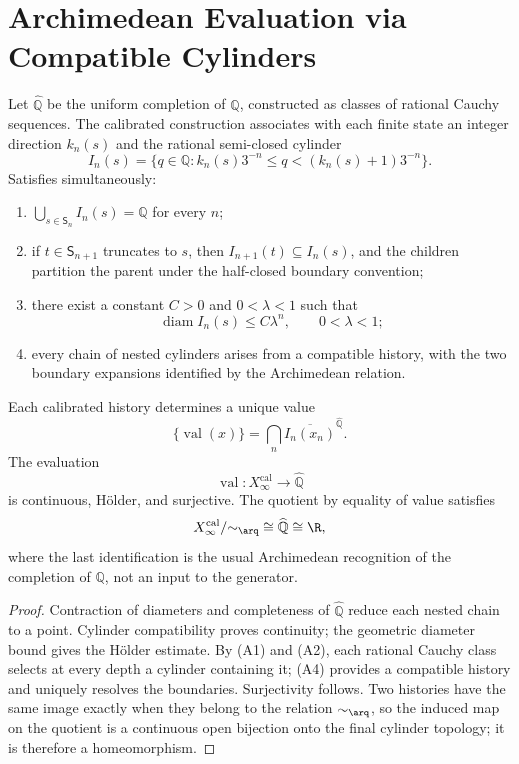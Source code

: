 \section{Archimedean Evaluation via Compatible Cylinders}

Let \(\widehat{\mathbb Q}\) be the uniform completion of \(\mathbb Q\), constructed as
classes of rational Cauchy sequences. The calibrated construction associates
with each finite state an integer direction \(k_n(s)\) and the rational
semi-closed cylinder
\[
 I_n(s)=\{q\in\mathbb Q:k_n(s)3^{-n}\le q<(k_n(s)+1)3^{-n}\}.
\]
Satisfies simultaneously:
\begin{enumerate}[label=\textup{(A\arabic*)}]
\item \(\bigcup_{s\in\mathsf S_n}I_n(s)=\mathbb Q\) for every \(n\);
\item if \(t\in\mathsf S_{n+1}\) truncates to \(s\), then
      \(I_{n+1}(t)\subseteq I_n(s)\), and the children partition the parent under the half-closed boundary convention;
\item there exist a constant \(C>0\) and \(0<\lambda<1\) such that
\[
 \operatorname{diam}I_n(s)\le C\lambda^n,
 \qquad 0<\lambda<1;
\]
\item every chain of nested cylinders arises from a compatible history,
      with the two boundary expansions identified by the
      Archimedean relation.
\end{enumerate}

\begin{theorem}
\label{thm:espiral-cierre-arquimediano-continuo-genealogico}
Each calibrated history determines a unique value
\[
 \{\operatorname{val}(x)\}
 =\bigcap_n\overline{I_n(x_n)}^{\widehat{\mathbb Q}}.
\]
The evaluation
\[
 \operatorname{val}:X_\infty^{\mathrm{cal}}\longrightarrow\widehat{\mathbb Q}
\]
is continuous, Hölder, and surjective. The quotient by equality of value
satisfies
\[
 X_\infty^{\mathrm{cal}}/{\sim_{\arq}}
 \cong\widehat{\mathbb Q}\cong\R,
\]
where the last identification is the usual Archimedean recognition of
the completion of \(\mathbb Q\), not an input to the generator.
\end{theorem}
\begin{proof}
Contraction of diameters and completeness of \(\widehat{\mathbb Q}\) reduce each
nested chain to a point. Cylinder compatibility proves continuity; the
geometric diameter bound gives the Hölder estimate. By (A1) and (A2),
each rational Cauchy class selects at every depth a cylinder containing
it;
(A4) provides a compatible history and uniquely resolves the
boundaries. Surjectivity follows. Two histories have the same
image exactly when they belong to the relation \(\sim_{\arq}\), so
the induced map on the quotient is a continuous open bijection
onto the final cylinder topology; it is therefore a homeomorphism.
\end{proof}

